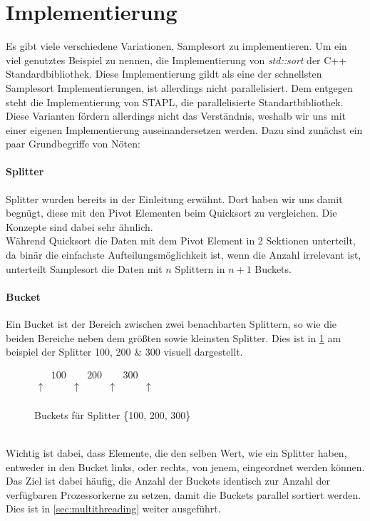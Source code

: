 \section{Implementierung}
	\label{sec:implementation}
	Es gibt viele verschiedene Variationen, Samplesort zu implementieren.
	Um ein viel genutztes Beispiel zu nennen, die Implementierung von \textit{std::sort} der C++ Standardbibliothek. \autocite{unknown-author-2019}
	Diese Implementierung gildt als eine der schnellsten Samplesort Implementierungen, ist allerdings nicht parallelisiert.
	Dem entgegen steht die Implementierung von STAPL, die parallelisierte Standartbibliothek. \autocite{berlin-2007}\\
	Diese Varianten fördern allerdings nicht das Verständnis, weshalb wir uns mit einer eigenen Implementierung auseinandersetzen werden.
	Dazu sind zunächst ein paar Grundbegriffe von Nöten:
	\paragraph{Splitter}
		Splitter wurden bereits in der Einleitung erwähnt.
		Dort haben wir uns damit begnügt, diese mit den Pivot Elementen beim Quicksort zu vergleichen.
		Die Konzepte sind dabei sehr ähnlich.\\
		Während Quicksort die Daten mit dem Pivot Element in 2 Sektionen unterteilt, da binär die einfachste Aufteilungsmöglichkeit ist, wenn die Anzahl irrelevant ist, unterteilt Samplesort die Daten mit $n$ Splittern in $n+1$ Buckets.
	\paragraph{Bucket}
		Ein Bucket ist der Bereich zwischen zwei benachbarten Splittern, so wie die beiden Bereiche neben dem größten sowie kleinsten Splitter.
		Dies ist in \ref{fig:buckets-from-splitters} am beispiel der Splitter 100, 200 \& 300 visuell dargestellt.
		\begin{figure}[h]
			\caption{Buckets für Splitter \{100, 200, 300\} \autocite{benson-2022}}
			\label{fig:buckets-from-splitters}
			\begin{center}
				\begin{math}
					\begin{matrix}
								 & 100 &          & 200 &          & 300 &          \\
						\uparrow &     & \uparrow &     & \uparrow &     & \uparrow \\
					\end{matrix}
				\end{math}
			\end{center}
		\end{figure}\\
		Wichtig ist dabei, dass Elemente, die den selben Wert, wie ein Splitter haben, entweder in den Bucket links, oder rechts, von jenem, eingeordnet werden können.\\
		Das Ziel ist dabei häufig, die Anzahl der Buckets identisch zur Anzahl der verfügbaren Prozessorkerne zu setzen, damit die Buckets parallel sortiert werden.
		Dies ist in \ref{sec:multithreading} weiter ausgeführt.

